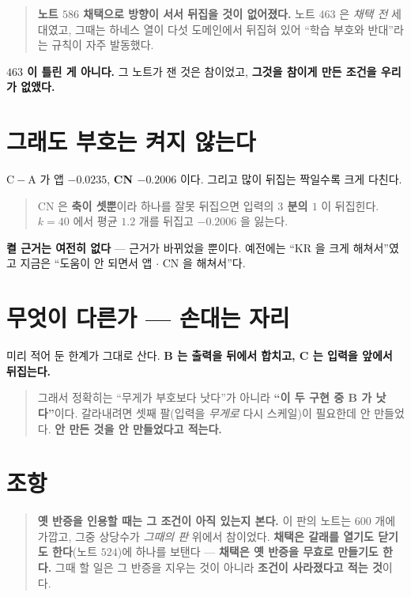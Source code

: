 \documentclass[11pt]{article}
\begin{document}
\begin{quote}
\textbf{노트 $586$ 채택으로 방향이 서서 뒤집을 것이 없어졌다.} 노트 $463$ 은
\emph{채택 전} 세대였고, 그때는 하네스 열이 다섯 도메인에서 뒤집혀 있어
``학습 부호와 반대''라는 규칙이 자주 발동했다.
\end{quote}

\textbf{$463$ 이 틀린 게 아니다.} 그 노트가 잰 것은 참이었고, \textbf{그것을
참이게 만든 조건을 우리가 없앴다.}

\section{그래도 부호는 켜지 않는다}

$\mathrm{C}-\mathrm{A}$ 가 앱 $-0.0235$, \textbf{CN $-0.2006$} 이다. 그리고
많이 뒤집는 짝일수록 크게 다친다.

\begin{quote}
CN 은 \textbf{축이 셋뿐}이라 하나를 잘못 뒤집으면 입력의 \textbf{$3$ 분의
$1$} 이 뒤집힌다. $k{=}40$ 에서 평균 $1.2$ 개를 뒤집고 $-0.2006$ 을 잃는다.
\end{quote}

\textbf{켤 근거는 여전히 없다} --- 근거가 바뀌었을 뿐이다. 예전에는
``KR 을 크게 해쳐서''였고 지금은 ``도움이 안 되면서 앱 $\cdot$ CN 을
해쳐서''다.

\section*{무엇이 다른가 --- 손대는 자리}

미리 적어 둔 한계가 그대로 산다. \textbf{B 는 출력을 뒤에서 합치고,
C 는 입력을 앞에서 뒤집는다.}

\begin{quote}
그래서 정확히는 ``무게가 부호보다 낫다''가 아니라 \textbf{``이 두 구현 중
B 가 낫다''}이다. 갈라내려면 셋째 팔(입력을 \emph{무게로} 다시 스케일)이
필요한데 안 만들었다. \textbf{안 만든 것을 안 만들었다고 적는다.}
\end{quote}

\section*{조항}

\begin{quote}
\textbf{옛 반증을 인용할 때는 그 조건이 아직 있는지 본다.} 이 판의 노트는
$600$ 개에 가깝고, 그중 상당수가 \emph{그때의 판} 위에서 참이었다.
\textbf{채택은 갈래를 열기도 닫기도 한다}(노트 $524$)에 하나를 보탠다 ---
\textbf{채택은 옛 반증을 무효로 만들기도 한다.} 그때 할 일은 그 반증을
지우는 것이 아니라 \textbf{조건이 사라졌다고 적는 것}이다.
\end{quote}
\end{document}
